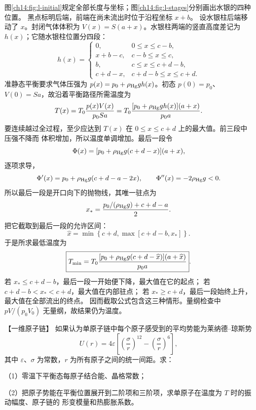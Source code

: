 {\begin{xesolution}
图\ref{ch14:fig:l-initial}规定全部长度与坐标；图\ref{ch14:fig:l-stages}分别画出水银的四种位置。
黑点标明后端，前端在尚未流出时位于沿程坐标 $x+b$。
\lPipeStagesDiagram
设水银柱后端移动了 $x$。封闭气体体积为 $V(x)=S(a+x)$。水银柱两端的竖直高度差记为
$h(x)$；它随水银柱位置分四段：
\[
h(x)=
\begin{cases}
0,&0\le x\le c-b,\\
x+b-c,&c-b\le x\le c,\\
b,&c\le x\le c+d-b,\\
c+d-x,&c+d-b\le x\le c+d.
\end{cases}
\]
准静态平衡要求气体压强为 $p(x)=p_0+\rho_{\rm Hg}g h(x)$。初态 $p(0)=p_0$、
$V(0)=Sa$，故沿着平衡路径所需温度为
\[
 T(x)=T_0\frac{p(x)V(x)}{p_0Sa}
 =T_0\frac{[p_0+\rho_{\rm Hg}g h(x)](a+x)}{p_0a}.
\]
要连续越过全过程，至少应达到 $T(x)$ 在 $0\le x\le c+d$ 上的最大值。前三段中压强不降而
体积增加，所以温度单调增加。最后一段令
\[
 \Phi(x)=[p_0+\rho_{\rm Hg}g(c+d-x)](a+x),
\]
逐项求导，
\[
 \Phi'(x)=p_0+\rho_{\rm Hg}g(c+d-a-2x),\qquad
 \Phi''(x)=-2\rho_{\rm Hg}g<0.
\]
所以最后一段是开口向下的抛物线，其唯一驻点为
\[
 x_*=\frac{p_0/(\rho_{\rm Hg}g)+c+d-a}{2}.
\]
把它截取到最后一段的允许区间：
\[
 \widehat x=\min\!\left\{c+d,
 \max\!\left[c+d-b,x_*\right]\right\}.
\]
于是所求最低温度为
\[
 \boxed{T_{\min}=T_0
 \frac{[p_0+\rho_{\rm Hg}g(c+d-\widehat x)](a+\widehat x)}{p_0a}}.
\]
若 $x_*\le c+d-b$，最后一段一开始便下降，最大值在它的起点；
若 $c+d-b<x_*<c+d$，最大值在内部驻点；
若 $x_*\ge c+d$，最后一段始终上升，最大值在全部流出的终点。
因而截取公式包含这三种情形。量纲检查中
$pV/(p_0V_0)$ 无量纲，故结果仍为温度。
\end{xesolution}

\begin{origexamplebox}{【一维原子链】}\label{ch14:ex:s28-19-11}
如果认为单原子链中每个原子感受到的平均势能为莱纳德--琼斯势
\begin{equation}
  U(r)=4\varepsilon\left[\left(\frac{\sigma}{r}\right)^{12}
  -\left(\frac{\sigma}{r}\right)^6\right],
\end{equation}
其中 $\varepsilon$、$\sigma$ 为常数，$r$ 为所有原子之间的统一间距。求：

（1）零温下平衡态每原子结合能、晶格常数；

（2）把原子势能在平衡位置展开到二阶项和三阶项，求单原子在温度为 $T$ 时的振动幅度、原子链的
形变模量和热膨胀系数。

\ThQChain
\end{origexamplebox}

}
